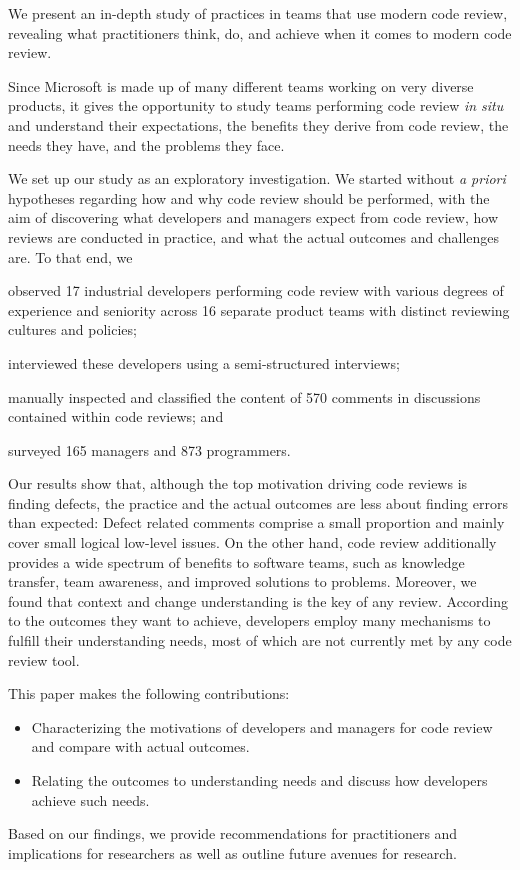 We present an in-depth study of practices in teams that use modern code review,
revealing what practitioners think, do, and achieve when it comes to modern
code review.

Since Microsoft is made up of many different teams working on very diverse
products, it gives the opportunity to study teams performing code review \emph{in
situ} and understand their expectations, the benefits they derive from code
review, the needs they have, and the problems they face.

We set up our study as an exploratory investigation. We started without \emph{a
priori} hypotheses regarding how and why code review should be performed, with
the aim of discovering what developers and managers expect from code review,
how reviews are conducted in practice, and what the actual outcomes and
challenges are. To that end, we \begin{inparaenum}[(1)] 
\item observed 17 industrial developers performing code review with various degrees of experience and seniority across 16 separate product teams with distinct reviewing cultures and policies; 
\item interviewed these developers using a semi-structured interviews; 
\item manually inspected and classified the content of 570 comments in discussions contained within code reviews; and 
\item surveyed 165 managers and 873 programmers.
\end{inparaenum}

Our results show that, although the top motivation driving code reviews is
finding defects, the practice and the actual outcomes are less about
finding errors than expected: Defect related comments comprise a small
proportion and mainly cover small logical low-level issues. On the other hand,
code review additionally provides a wide spectrum of benefits to software
teams, such as knowledge transfer, team awareness, and improved solutions to
problems. Moreover, we found that context and change understanding is the key
of any review. According to the outcomes they want to achieve, developers
employ many mechanisms to fulfill their understanding needs, most of which are
not currently met by any code review tool.

This paper makes the following contributions:
\begin{itemize}
  \item Characterizing the motivations of developers and managers for code review and compare with actual outcomes.
  \item Relating the outcomes to understanding needs and discuss how developers achieve such needs.
\end{itemize}

Based on our findings, we provide recommendations for practitioners and
implications for researchers as well as outline future avenues for research.